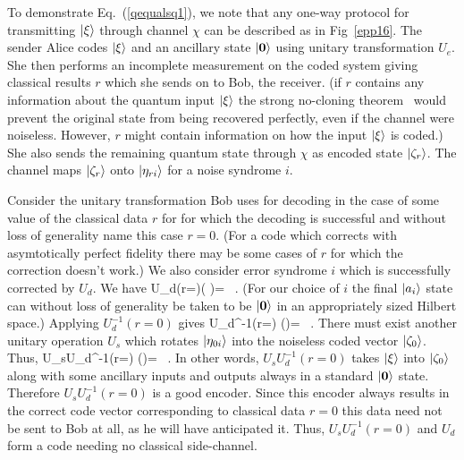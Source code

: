 To demonstrate Eq.~(\ref{qequalsq1}), we note that
any one-way protocol for transmitting $| \xi \rangle$ through channel 
$\chi$ can be described as in Fig~\ref{epp16}.  The sender 
Alice codes $| \xi \rangle$ and an ancillary state 
$| \mbox{\boldmath{$0$}} \rangle$ using 
unitary transformation $U_e$.  She then performs an incomplete
measurement on the coded system giving classical results
$r$ which she sends on to Bob, the receiver. 
(if $r$ contains any information about 
the quantum input $| \xi \rangle$ the strong no-cloning theorem~\cite{BBM} 
would prevent the original state from being recovered perfectly,
even if the channel were noiseless.  However, $r$ might contain 
information on how the input $| \xi \rangle$ is coded.)  She also sends 
the remaining quantum state through $\chi$ as encoded state $| \zeta_r \rangle$.  
The channel maps $| \zeta_r \rangle$ onto $| \eta_{ri} \rangle$ for a noise 
syndrome $i$.  

Consider the unitary transformation Bob uses for decoding 
in the case of some value of the classical data $r$ for
for which the decoding is successful 
and without loss of generality name this case $r\!=\!0$.
(For a code which corrects with asymtotically perfect fidelity there may
be some cases of $r$ for which the correction doesn't work.) 
We also consider error syndrome $i$ which is successfully corrected
by $U_d$.  We have
\beq
U_d(r\!=)( \otimes {})=\ket{\xi}
\otimes{}\ .
\eeq
(For our choice of $i$ the final $| a_i \rangle$ state can 
without loss of generality be taken to be $| \mbox{\boldmath{$0$}} \rangle$ 
in an appropriately sized Hilbert space.)  Applying $U_d^{-1}(r\!=\!0)$ gives
\beq
U_d^{-1}(r\!=) (\ket{\xi}\otimes{})=
\otimes{}\ .
\eeq
There must exist another unitary operation $U_s$ which rotates
$| \eta_{0i} \rangle$ into the noiseless coded vector
$| \zeta_0 \rangle$. Thus, 
\beq
U_sU_d^{-1}(r\!=) (\ket{\xi}\otimes{})=
\otimes{}\ .
\eeq
In other words, $U_sU_d^{-1}(r\!=\!0)$ takes $| \xi \rangle$ into 
$| \zeta_0 \rangle$ along with some ancillary inputs and outputs
always in a standard 
$| \mbox{\boldmath{$0$}} \rangle$ state.
Therefore $U_sU_d^{-1}(r\!=\!0)$ is a good encoder.
Since this encoder always results in the correct code vector
corresponding to classical data $r\!=\!0$ this data need not be sent 
to Bob at all, as he will have anticipated it. 
Thus, $U_sU_d^{-1}(r\!=\!0)$ and $U_d$ 
form a code needing no classical side-channel.

